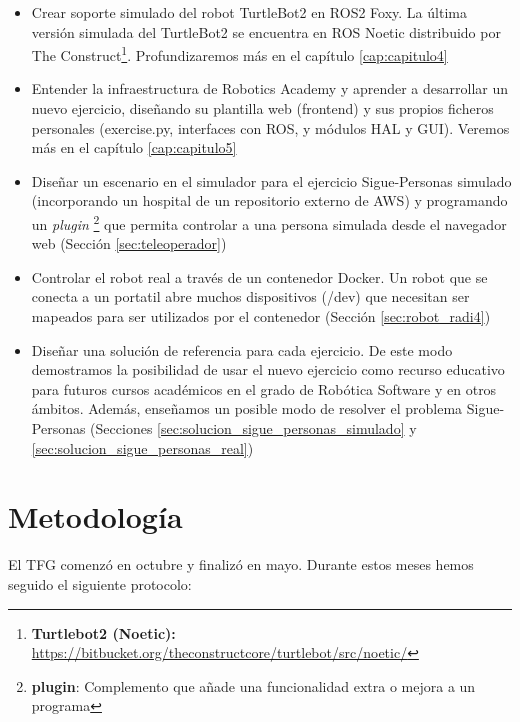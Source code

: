 \begin{itemize}
	\item Crear soporte simulado del robot TurtleBot2 en ROS2 Foxy. La última versión simulada del TurtleBot2 se encuentra en ROS Noetic distribuido por The Construct\footnote{\textbf{Turtlebot2 (Noetic):} \url{https://bitbucket.org/theconstructcore/turtlebot/src/noetic/}}. Profundizaremos más en el capítulo \ref{cap:capitulo4}
	\item Entender la infraestructura de Robotics Academy y aprender a desarrollar un nuevo ejercicio, diseñando su plantilla web (frontend) y sus propios ficheros personales (exercise.py, interfaces con ROS, y módulos HAL y GUI). Veremos más en el capítulo \ref{cap:capitulo5}
	\item Diseñar un escenario en el simulador para el ejercicio Sigue-Personas simulado (incorporando un hospital de un repositorio externo de AWS) y programando un \textit{plugin} \footnote{\textbf{plugin}: Complemento que añade una funcionalidad extra o mejora a un programa} que permita controlar a una persona simulada desde el navegador web (Sección \ref{sec:teleoperador})
	\item Controlar el robot real a través de un contenedor Docker. Un robot que se conecta a un portatil abre muchos dispositivos (/dev) que necesitan ser mapeados para ser utilizados por el contenedor (Sección \ref{sec:robot_radi4})
	\item Diseñar una solución de referencia para cada ejercicio. De este modo demostramos la posibilidad de usar el nuevo ejercicio como recurso educativo para futuros cursos académicos en el grado de Robótica Software y en otros ámbitos. Además, enseñamos un posible modo de resolver el problema Sigue-Personas (Secciones \ref{sec:solucion_sigue_personas_simulado} y \ref{sec:solucion_sigue_personas_real})
\end{itemize}



\section{Metodología}
\label{sec:metodologia}
El TFG comenzó en octubre y finalizó en mayo. Durante estos meses hemos seguido el siguiente protocolo:

